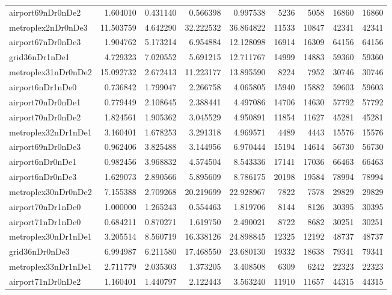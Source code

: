 \begin{longtable}{|l|r|r|r|r|r|r|r|r|}
airport69nDr0nDe2 & 1.604010 & 0.431140 & 0.566398 & 0.997538 & 5236 & 5058 & 16860 & 16860 \\
metroplex2nDr0nDe3 & 11.503759 & 4.642290 & 32.222532 & 36.864822 & 11533 & 10847 & 42341 & 42341 \\
airport67nDr0nDe3 & 1.904762 & 5.173214 & 6.954884 & 12.128098 & 16914 & 16309 & 64156 & 64156 \\
grid36nDr1nDe1 & 4.729323 & 7.020552 & 5.691215 & 12.711767 & 14999 & 14883 & 59360 & 59360 \\
metroplex31nDr0nDe2 & 15.092732 & 2.672413 & 11.223177 & 13.895590 & 8224 & 7952 & 30746 & 30746 \\
airport6nDr1nDe0 & 0.736842 & 1.799047 & 2.266758 & 4.065805 & 15940 & 15882 & 59603 & 59603 \\
airport70nDr0nDe1 & 0.779449 & 2.108645 & 2.388441 & 4.497086 & 14706 & 14630 & 57792 & 57792 \\
airport70nDr0nDe2 & 1.824561 & 1.905362 & 3.045529 & 4.950891 & 11854 & 11627 & 45281 & 45281 \\
metroplex32nDr1nDe1 & 3.160401 & 1.678253 & 3.291318 & 4.969571 & 4489 & 4443 & 15576 & 15576 \\
airport69nDr0nDe3 & 0.962406 & 3.825488 & 3.144956 & 6.970444 & 15194 & 14614 & 56730 & 56730 \\
airport6nDr0nDe1 & 0.982456 & 3.968832 & 4.574504 & 8.543336 & 17141 & 17036 & 66463 & 66463 \\
airport6nDr0nDe3 & 1.629073 & 2.890566 & 5.895609 & 8.786175 & 20198 & 19584 & 78994 & 78994 \\
metroplex30nDr0nDe2 & 7.155388 & 2.709268 & 20.219699 & 22.928967 & 7822 & 7578 & 29829 & 29829 \\
airport70nDr1nDe0 & 1.000000 & 1.265243 & 0.554463 & 1.819706 & 8144 & 8126 & 30395 & 30395 \\
airport71nDr1nDe0 & 0.684211 & 0.870271 & 1.619750 & 2.490021 & 8722 & 8682 & 30251 & 30251 \\
metroplex30nDr1nDe1 & 3.205514 & 8.560719 & 16.338126 & 24.898845 & 12325 & 12192 & 48737 & 48737 \\
grid36nDr0nDe3 & 6.994987 & 6.211580 & 17.468550 & 23.680130 & 19332 & 18638 & 79341 & 79341 \\
metroplex33nDr1nDe1 & 2.711779 & 2.035303 & 1.373205 & 3.408508 & 6309 & 6242 & 22323 & 22323 \\
airport71nDr0nDe2 & 1.160401 & 1.440797 & 2.122443 & 3.563240 & 11910 & 11657 & 44315 & 44315 \\

\end{longtable}
